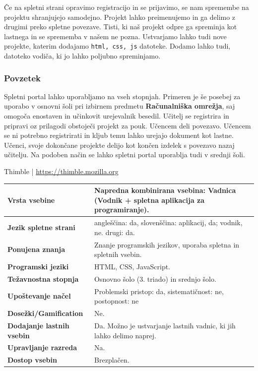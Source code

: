  Če na spletni strani opravimo registracijo in se prijavimo, se nam
 spremembe na projektu shranjujejo samodejno. Projekt lahko
 preimenujemo in ga delimo z drugimi preko spletne povezave. Tisti, ki
 naš projekt odpre ga spreminja kot lastnega in se sprememba v našem
 ne pozna. Ustvarjamo lahko tudi nove projekte, katerim dodajamo
 \texttt{html, css, js} datoteke. Dodamo lahko tudi, datoteko vodiča,
 ki jo lahko poljubno spreminjamo.
 
\subsubsection{Povzetek}
\label{sec:povzetek_thimble}

Spletni portal lahko uporabljamo na vseh stopnjah. Primeren je še
posebej za uporabo v osnovni šoli pri izbirnem predmetu
\textbf{Računalniška omrežja}, saj omogoča enostaven in učinkovit
urejevalnik besedil. Učitelj se registrira in pripravi oz prilagodi
obstoječi projekt za pouk. Učencem deli povezavo. Učencem se ni
potrebno registrirati in kljub temu lahko urejajo dokument kot
lastne. Učenci, svoje dokončane projekte delijo kot končen izdelek s
povezavo nazaj učitelju. Na podoben način se lahko spletni portal
uporablja tudi v srednji šoli.

\begin{osebnabox}[label={osebna:thimble}]{Thimble |
    \url{https://thimble.mozilla.org}}
    \begin{tabular}{
  p{} |
  p{}  }
  \textbf{Vrsta vsebine} & Napredna kombinirana vsebina: Vadnica
                           (Vodnik + spletna aplikacija za
                           programiranje).   \\
      \hline
  \textbf{Jezik spletne strani} & angleščina: da, slovenščina:
                                  aplikacij, da; vodnik, ne. 
                                  drugi: da. \\
      \hline
  \textbf{Ponujena znanja} & Znanje programskih jezikov, uporaba
                             spletna in spletnih vsebin. \\
      \hline
 \textbf{Programski jeziki} & HTML, CSS, JavaScript. \\
      \hline
  \textbf{Težavnostna stopnja} & Osnovno šolo (3. triado) in srednjo
                                 šolo. \\
      \hline
   \textbf{Upoštevanje načel} & Problemski pristop: da,
                                sistematičnost: ne, postopnost: ne \\
      \hline
  \textbf{Dosežki/Gamification} & Ne. \\
      \hline
  \textbf{Dodajanje lastnih vsebin} & Da. Možno je ustvarjanje lastnih
                                      vadnic, ki jih lahko delimo
                                      naprej.  \\
      \hline
  \textbf{Upravljanje razreda} & Na. \\
      \hline
  \textbf{Dostop vsebin} & Brezplačen. \\

\end{tabular}
\end{osebnabox}


